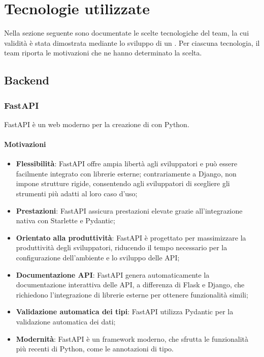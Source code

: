 \section{Tecnologie utilizzate}\label{sec:tecnologie}
\par Nella sezione seguente sono documentate le scelte tecnologiche del team, la cui validità è stata dimostrata mediante lo sviluppo di un . Per ciascuna tecnologia, il team riporta le motivazioni che ne hanno determinato la scelta.

\subsection{Backend}\label{sec:tecnologie-backend}

\subsubsection{FastAPI}\label{sec:fastapi}
\par FastAPI è un  web moderno per la creazione di  con Python.
\paragraph*{Motivazioni}
\begin{itemize}
  \item \textbf{Flessibilità}: FastAPI offre ampia libertà agli sviluppatori e può essere facilmente integrato con librerie esterne; contrariamente a Django, non impone strutture rigide, consentendo agli sviluppatori di scegliere gli strumenti più adatti al loro caso d'uso;
  \item \textbf{Prestazioni}: FastAPI assicura prestazioni elevate grazie all'integrazione nativa con Starlette e Pydantic;
  \item \textbf{Orientato alla produttività}: FastAPI è progettato per massimizzare la produttività degli sviluppatori, riducendo il tempo necessario per la configurazione dell'ambiente e lo sviluppo delle API;
  \item \textbf{Documentazione API}: FastAPI genera automaticamente la documentazione interattiva delle API, a differenza di Flask e Django, che richiedono l'integrazione di librerie esterne per ottenere funzionalità simili;
  \item \textbf{Validazione automatica dei tipi}: FastAPI utilizza Pydantic per la validazione automatica dei dati;
  \item \textbf{Modernità}: FastAPI è un framework moderno, che sfrutta le funzionalità più recenti di Python, come le annotazioni di tipo.
\end{itemize}

